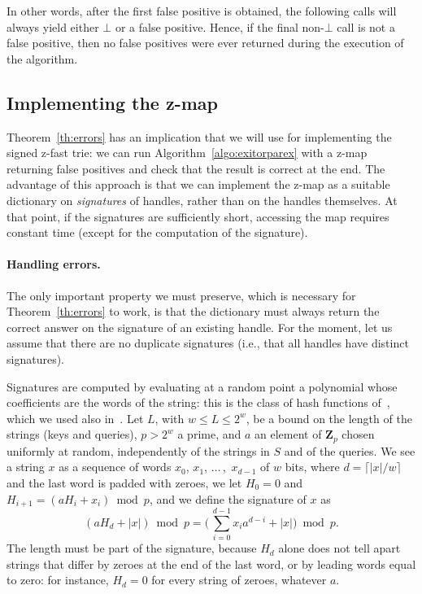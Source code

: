 \documentclass[a4paper]{article}
\newcommand{\?}{\mskip1.5mu}
\begin{document}
In other words, after the first false positive is obtained, the following calls will always yield
either $\bot$ or a false positive. Hence, if the final non-$\bot$ call is not a false positive, then
no false positives were ever returned during the execution of the algorithm.


\subsection{Implementing the z-map}
\label{sec:dict}


Theorem~\ref{th:errors} has an implication that we will use for implementing
the signed z-fast trie: we can run Algorithm~\ref{algo:exitorparex} with a z-map
returning false positives and check that the result is correct at the end.
The advantage of this approach is that we can implement the z-map as a suitable dictionary
on \emph{signatures} of handles, rather than on the handles themselves. At that point,
if the signatures are sufficiently short, accessing the map requires constant time (except for the computation of the signature).


\paragraph{Handling errors.}
The only important property we must preserve, which is necessary for Theorem~\ref{th:errors} to work, 
 is that the dictionary must always return
the correct answer on the signature of an existing handle. For the moment, let us assume that
there are no duplicate signatures (i.e., that all handles have distinct signatures).

Signatures are computed by evaluating at a random point a polynomial whose coefficients are the words of the
string: this is the class of hash functions of~\cite[Section~5]{Dietzfelbinger1992Polynomial}, which we used
also in~\cite{Belazzougui2010Fast}. Let $L$, with $w\leq L\leq 2^w$, be a bound on the length of the strings (keys and queries),
$p>2^w$ a prime, and $a$ an element of $\mathbf Z_p$ chosen uniformly at random, independently of the strings in $S$ and of the queries. We see a string $x$
as a sequence of words $x_0$, $x_1$, $\dots\,$,~$x_{d-1}$ of $w$ bits, where $d=\lceil |x|/w\rceil$ and the last word is padded with zeroes,
we let $H_0=0$ and $H_{i+1}=(aH_i+x_i)\bmod p$, and we define the signature of $x$ as
\[
	(aH_d+|x|)\bmod p=\biggl(\,\sum_{i=0}^{d-1}x_ia^{d-i}+|x|\biggr)\bmod p.
\]
The length must be part of the signature, because $H_d$ alone does not tell apart strings that differ by zeroes at the end of the last word, or by
leading words equal to zero: for instance, $H_d=0$ for every string of zeroes, whatever $a$.
\end{document}

